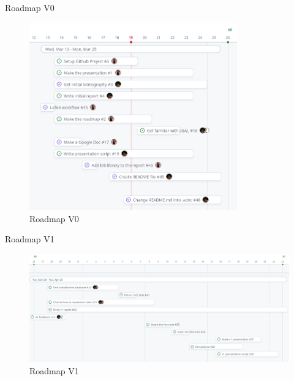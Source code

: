 \documentclass[10pt]{beamer}
\begin{document}
\begin{frame}{Roadmap V0}
  \begin{figure}[h] %
    \centering
    \includegraphics[width=0.8\textwidth]{images/roadmap_v0.png}
    \caption{Roadmap V0} %
    \label{} %
    \end{figure}
\end{frame}

\begin{frame}{Roadmap V1}
  \begin{figure}[h] %
    \centering
    \includegraphics[width=1\textwidth]{images/roadmap_v1.png}
    \caption{Roadmap V1} %
    \label{} %
    \end{figure}
\end{frame}
\end{document}
